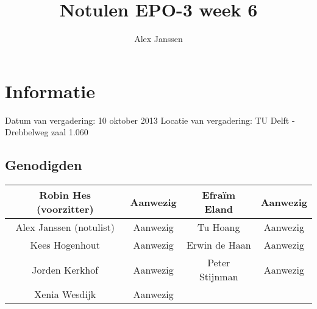 \documentclass{article}
\begin{document}
\title{Notulen EPO-3 week 6 }%
\author{Alex Janssen}%
\maketitle

\section*{Informatie}
Datum van vergadering: 10 oktober 2013 %
Locatie van vergadering: TU Delft - Drebbelweg zaal 1.060 %
\subsection*{Genodigden}
\begin{center}
\begin{tabular}{|c |c | c| c|}
	\hline
Robin Hes (voorzitter) & Aanwezig & Efraïm Eland & Aanwezig \\
	\hline
Alex Janssen (notulist) & Aanwezig & Tu Hoang & Aanwezig \\
	\hline
Kees Hogenhout & Aanwezig & Erwin de Haan & Aanwezig\\
	\hline
Jorden Kerkhof & Aanwezig & Peter Stijnman & Aanwezig \\
	\hline
Xenia Wesdijk & Aanwezig & & \\
	\hline
\end{tabular}
\end{center}
\end{document}
